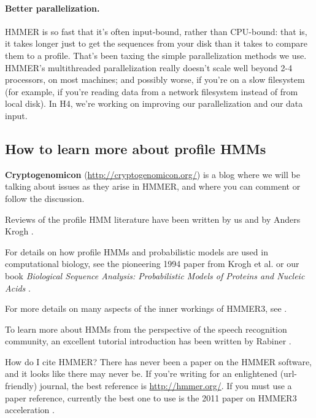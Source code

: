 \paragraph{Better parallelization.} HMMER is so fast that it's often
input-bound, rather than CPU-bound: that is, it takes longer just to
get the sequences from your disk than it takes to compare them to a
profile. That's been taxing the simple parallelization methods we
use. HMMER's multithreaded parallelization really doesn't scale well
beyond 2-4 processors, on most machines; and possibly worse, if you're
on a slow filesystem (for example, if you're reading data from a
network filesystem instead of from local disk). In H4, we're working
on improving our parallelization and our data input.

\subsection{How to learn more about profile HMMs}

\textbf{Cryptogenomicon} (\url{http://cryptogenomicon.org/}) is a blog
where we will be talking about issues as they arise in HMMER, and
where you can comment or follow the discussion.

Reviews of the profile HMM literature have been written by us
\citep{Eddy96,Eddy98} and by Anders Krogh \citep{Krogh98}.

For details on how profile HMMs and probabilistic models are used in
computational biology, see the pioneering 1994 paper from Krogh et
al. \citep{Krogh94} or our book \emph{Biological Sequence Analysis:
Probabilistic Models of Proteins and Nucleic Acids} \citep{Durbin98}.

For more details on many aspects of the inner workings of HMMER3, see
\citep{Eddy08,Eddy09b,Eddy11}.

To learn more about HMMs from the perspective of the speech
recognition community, an excellent tutorial introduction has been
written by Rabiner \citep{Rabiner89}.

\vspace{2em}
\begin{srefaq}{How do I cite HMMER?}
There has never been a paper on the HMMER software, and it looks like
there may never be. If you're writing
for an enlightened (url-friendly) journal, the best reference is
\url{http://hmmer.org/}.  If you must use a paper reference, currently
the best one to use is the 2011 paper on HMMER3 acceleration \citep{Eddy11}.
\end{srefaq}















  









